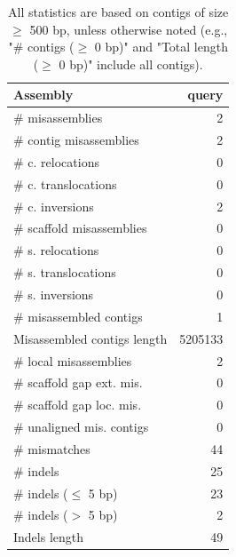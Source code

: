 \documentclass[12pt,a4paper]{article}
\begin{document}
\begin{table}[ht]
\begin{center}
\caption{All statistics are based on contigs of size $\geq$ 500 bp, unless otherwise noted (e.g., "\# contigs ($\geq$ 0 bp)" and "Total length ($\geq$ 0 bp)" include all contigs).}
\begin{tabular}{|l*{1}{|r}|}
\hline
Assembly & query \\ \hline
\# misassemblies & 2 \\ \hline
\hspace{2mm}\# contig misassemblies & 2 \\ \hline
\hspace{5mm}\# c. relocations & 0 \\ \hline
\hspace{5mm}\# c. translocations & 0 \\ \hline
\hspace{5mm}\# c. inversions & 2 \\ \hline
\hspace{2mm}\# scaffold misassemblies & 0 \\ \hline
\hspace{5mm}\# s. relocations & 0 \\ \hline
\hspace{5mm}\# s. translocations & 0 \\ \hline
\hspace{5mm}\# s. inversions & 0 \\ \hline
\# misassembled contigs & 1 \\ \hline
Misassembled contigs length & 5205133 \\ \hline
\# local misassemblies & 2 \\ \hline
\# scaffold gap ext. mis. & 0 \\ \hline
\# scaffold gap loc. mis. & 0 \\ \hline
\# unaligned mis. contigs & 0 \\ \hline
\# mismatches & 44 \\ \hline
\# indels & 25 \\ \hline
\hspace{5mm}\# indels ($\leq$ 5 bp) & 23 \\ \hline
\hspace{5mm}\# indels ($>$ 5 bp) & 2 \\ \hline
Indels length & 49 \\ \hline
\end{tabular}
\end{center}
\end{table}
\end{document}
